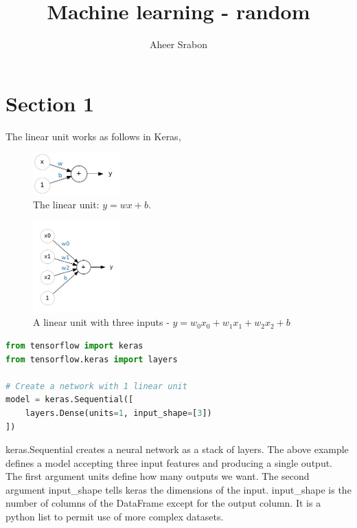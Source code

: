 

\title{Machine learning - random}
\author{Aheer Srabon}
\date{}


\maketitle

\section{Section 1}
\noindent The linear unit works as follows in Keras,

\begin{figure}[htp]
	\centering
	\includegraphics[width=0.3\textwidth]{../assets/machine_learning_random/the_linear_unit.png}
	\caption{The linear unit: $ y = wx + b $.}
\end{figure}

\begin{figure}[htp]
	\centering
	\includegraphics[width=0.3\textwidth]{../assets/machine_learning_random/a_linear_unit_with_multiple_inputs.png}
	\caption{A linear unit with three inputs - $ y = w_0 x_0 + w_1 x_1 + w_2 x_2 + b $}
\end{figure}

\pagebreak

\begin{lstlisting}[language=Python]
from tensorflow import keras
from tensorflow.keras import layers

# Create a network with 1 linear unit
model = keras.Sequential([
	layers.Dense(units=1, input_shape=[3])
])
\end{lstlisting}

\noindent keras.Sequential creates a neural network as a stack
of layers. The above example defines a model accepting three input
features and producing a single output. The first argument units
define how many outputs we want. The second argument input\_shape
tells keras the dimensions of the input. input\_shape is the number
of columns of the DataFrame except for the output column. It is a
python list to permit use of more complex datasets.

